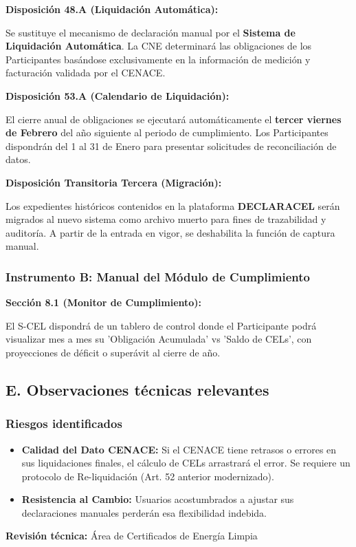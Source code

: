 \documentclass{cel}
\begin{document}
\textbf{Disposición 48.A (Liquidación Automática):}

\textquotedbl{}Se sustituye el mecanismo de declaración manual por el \textbf{Sistema de Liquidación Automática}. La CNE determinará las obligaciones de los Participantes basándose exclusivamente en la información de medición y facturación validada por el CENACE.\textquotedbl{}


\textbf{Disposición 53.A (Calendario de Liquidación):}

\textquotedbl{}El cierre anual de obligaciones se ejecutará automáticamente el \textbf{tercer viernes de Febrero} del año siguiente al periodo de cumplimiento. Los Participantes dispondrán del 1 al 31 de Enero para presentar solicitudes de reconciliación de datos.\textquotedbl{}


\textbf{Disposición Transitoria Tercera (Migración):}

\textquotedbl{}Los expedientes históricos contenidos en la plataforma \textbf{DECLARACEL} serán migrados al nuevo sistema como archivo muerto para fines de trazabilidad y auditoría. A partir de la entrada en vigor, se deshabilita la función de captura manual.\textquotedbl{}


\subsubsection{Instrumento B: Manual del Módulo de Cumplimiento}
\nopagebreak

\textbf{Sección 8.1 (Monitor de Cumplimiento):}

\textquotedbl{}El S-CEL dispondrá de un tablero de control donde el Participante podrá visualizar mes a mes su 'Obligación Acumulada' vs 'Saldo de CELs', con proyecciones de déficit o superávit al cierre de año.\textquotedbl{}


\subsection{E. Observaciones técnicas relevantes}
\nopagebreak

\subsubsection{Riesgos identificados}
\nopagebreak

\begin{itemize}
\item \textbf{Calidad del Dato CENACE:} Si el CENACE tiene retrasos o errores en sus liquidaciones finales, el cálculo de CELs arrastrará el error. Se requiere un protocolo de \textquotedbl{}Re-liquidación\textquotedbl{} (Art. 52 anterior modernizado).
\item \textbf{Resistencia al Cambio:} Usuarios acostumbrados a \textquotedbl{}ajustar\textquotedbl{} sus declaraciones manuales perderán esa flexibilidad indebida.


\end{itemize}
\textbf{Revisión técnica:} Área de Certificados de Energía Limpia
\end{document}
